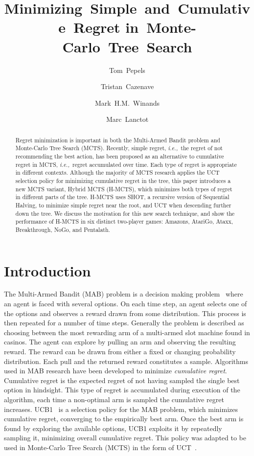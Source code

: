 \documentclass[a4paper]{llncs}
\title{Minimizing~Simple~and~Cumulative~Regret in~Monte-Carlo~Tree~Search}
\author{Tom~Pepels\inst{1} \and Tristan~Cazenave\inst{2} \and
Mark~H.M.~Winands\inst{1} \and Marc~Lanctot\inst{1}}
\institute{Department of Knowledge Engineering,  Maastricht University\\ \email{\{tom.pepels,m.winands,marc.lanctot\}@maastrichtuniversity.nl} \and LAMSADE - Université Paris-Dauphine \\ \email{cazenave@lamsade.dauphine.fr}}
\newcommand{\ie}{{\it i.e.,}~}
\begin{document}
\maketitle

\begin{abstract} Regret minimization is important in both the Multi-Armed Bandit problem and Monte-Carlo Tree Search (MCTS). Recently, simple regret, \ie the regret of not recommending the best action, has been proposed as an alternative to cumulative regret in MCTS, \ie regret accumulated over time. Each type of regret is appropriate in different contexts. Although the majority of MCTS research applies the UCT selection policy for minimizing cumulative regret in the tree, this paper introduces a new MCTS variant, Hybrid MCTS (H-MCTS), which minimizes both types of regret in different parts of the tree. H-MCTS uses SHOT, a recursive version of Sequential Halving, to minimize simple regret near the root, and UCT when descending further down the tree. We discuss the motivation for this new search technique, and show the performance of H-MCTS in six distinct two-player games: Amazons, AtariGo, Ataxx, Breakthrough, NoGo, and Pentalath.

\end{abstract}

\section{Introduction}
\label{sec:intro}

The Multi-Armed Bandit (MAB) problem is a decision making problem~\cite{auer2002using} where an agent is faced with several options. On each time step, an agent selects one of the options and observes a reward drawn from some distribution. This process is then repeated for a number of time steps.
Generally the problem is described as choosing between the most rewarding arm of a multi-armed slot machine found in casinos. The agent can explore by pulling an arm and observing the resulting reward. The reward can be drawn from either a fixed or changing probability distribution. Each pull and the returned reward constitutes a sample. Algorithms used in MAB research have been developed to minimize \emph{cumulative regret}. Cumulative regret is the expected regret of not having sampled the single best option in hindsight. This type of regret is accumulated during execution of the algorithm, each time a non-optimal arm is sampled the cumulative regret increases. UCB1~\cite{auer2002using} is a selection policy for the MAB problem, which minimizes cumulative regret, converging to the empirically best arm. Once the best arm is found by exploring the available options, UCB1 exploits it by repeatedly sampling it, minimizing overall cumulative regret. This policy was adapted to be used in Monte-Carlo Tree Search (MCTS) in the form of UCT~\cite{kocsis2006bandit}.
\end{document}

